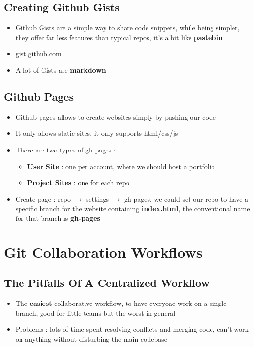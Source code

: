 \documentclass{report}
\begin{document}
\section{Creating Github Gists}

\begin{itemize}
	\item Github Gists are a simple way to share code snippets, while being simpler, they offer far less features than typical repos, it's a bit like \textbf{pastebin} 
	\item gist.github.com 
	\item A lot of Gists are \textbf{markdown}
\end{itemize}


\section{Github Pages}

\begin{itemize}
	\item Github pages allows to create websites simply by pushing our code 
	\item It only allows static sites, it only supports html/css/js 
	\item There are two types of gh pages :
		\begin{itemize}
			\item \textbf{User Site} : one per account, where we should host a portfolio
			\item \textbf{Project Sites} : one for each repo
		\end{itemize}
	\item Create page : repo $\rightarrow$ settings $\rightarrow$ gh pages, we could set our repo to have a specific branch for the website containing \textbf{index.html}, the conventional name for that branch is \textbf{gh-pages}  
\end{itemize}



\chapter{Git Collaboration Workflows}


\section{The Pitfalls Of A Centralized Workflow}

\begin{itemize}
	\item The \textbf{easiest} collaborative workflow, to have everyone work on a single branch, good for little teams but the worst in general 
	\item Problems : lots of time spent resolving conflicts and merging code, can't work on anything without disturbing the main codebase
\end{itemize}
\end{document}
